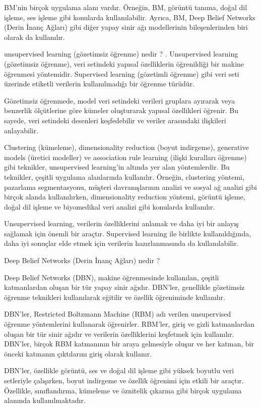 \documentclass[11pt]{article}
\begin{document}
BM'nin birçok uygulama alanı vardır. Örneğin, BM, görüntü tanıma, doğal dil işleme, ses işleme gibi konularda kullanılabilir. Ayrıca, BM, Deep Belief Networks (Derin İnanç Ağları) gibi diğer yapay sinir ağı modellerinin bileşenlerinden biri olarak da kullanılır.

unsupervised learning (gözetimsiz öğrenme) nedir ? 
. Unsupervised learning (gözetimsiz öğrenme), veri setindeki yapısal özelliklerin öğrenildiği bir makine öğrenmesi yöntemidir. Supervised learning (gözetimli öğrenme) gibi veri seti üzerinde etiketli verilerin kullanılmadığı bir öğrenme türüdür.

Gözetimsiz öğrenmede, model veri setindeki verileri gruplara ayırarak veya benzerlik ölçütlerine göre kümeler oluşturarak yapısal özellikleri öğrenir. Bu sayede, veri setindeki desenleri keşfedebilir ve veriler arasındaki ilişkileri anlayabilir.

Clustering (kümeleme), dimensionality reduction (boyut indirgeme), generative models (üretici modeller) ve association rule learning (ilişki kuralları öğrenme) gibi teknikler, unsupervised learning'in altında yer alan yöntemlerdir. Bu teknikler, çeşitli uygulama alanlarında kullanılır. Örneğin, clustering yöntemi, pazarlama segmentasyonu, müşteri davranışlarının analizi ve sosyal ağ analizi gibi birçok alanda kullanılırken, dimensionality reduction yöntemi, görüntü işleme, doğal dil işleme ve biyomedikal veri analizi gibi konularda kullanılır.

Unsupervised learning, verilerin özelliklerini anlamak ve daha iyi bir anlayış sağlamak için önemli bir araçtır. Supervised learning ile birlikte kullanıldığında, daha iyi sonuçlar elde etmek için verilerin hazırlanmasında da kullanılabilir.

Deep Belief Networks (Derin İnanç Ağları)  nedir ? 


Deep Belief Networks (DBN), makine öğrenmesinde kullanılan, çeşitli katmanlardan oluşan bir tür yapay sinir ağıdır. DBN'ler, genellikle gözetimsiz öğrenme teknikleri kullanılarak eğitilir ve özellik öğreniminde kullanılır.

DBN'ler, Restricted Boltzmann Machine (RBM) adı verilen unsupervised öğrenme yöntemlerini kullanarak öğrenirler. RBM'ler, giriş ve gizli katmanlardan oluşan bir tür sinir ağıdır ve verilerin özelliklerini keşfetmek için kullanılır. DBN'ler, birçok RBM katmanının bir araya gelmesiyle oluşur ve her katman, bir önceki katmanın çıktılarını giriş olarak kullanır.

DBN'ler, özellikle görüntü, ses ve doğal dil işleme gibi yüksek boyutlu veri setleriyle çalışırken, boyut indirgeme ve özellik öğrenimi için etkili bir araçtır. Özellikle, sınıflandırma, kümeleme ve öznitelik çıkarma gibi birçok uygulama alanında kullanılmaktadır.
\end{document}
